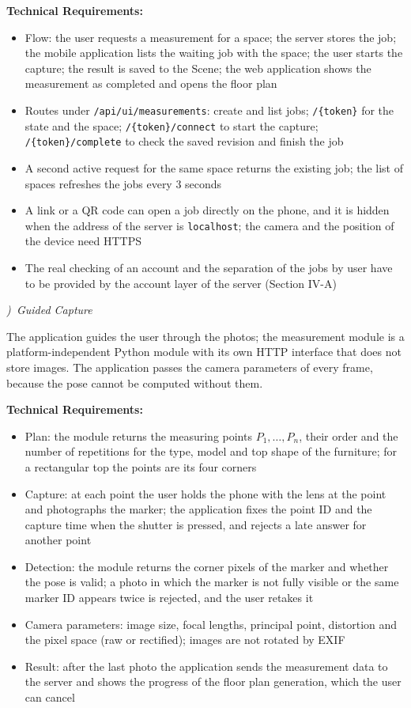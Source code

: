 \documentclass[conference]{IEEEtran}
\newcommand{\subsubhead}[1]{\par\noindent\refstepcounter{subsubsection}%
{\normalfont\normalsize\itshape\arabic{subsubsection})\ #1}\par\nopagebreak}
\newcommand{\TR}{\par\noindent\textbf{Technical Requirements:}\par\nopagebreak}
\begin{document}
\TR
\begin{itemize}
\item Flow: the user requests a measurement for a space; the server stores the job; the mobile application lists the waiting job with the space; the user starts the capture; the result is saved to the Scene; the web application shows the measurement as completed and opens the floor plan
\item Routes under \texttt{/api/ui/measurements}: create and list jobs; \texttt{/\{token\}} for the state and the space; \texttt{/\{token\}/connect} to start the capture; \texttt{/\{token\}/complete} to check the saved revision and finish the job
\item A second active request for the same space returns the existing job; the list of spaces refreshes the jobs every 3 seconds
\item A link or a QR code can open a job directly on the phone, and it is hidden when the address of the server is \texttt{localhost}; the camera and the position of the device need HTTPS
\item The real checking of an account and the separation of the jobs by user have to be provided by the account layer of the server (Section IV-A)
\end{itemize}

\subsubhead{Guided Capture}
\noindent\hspace*{\parindent}The application guides the user through the photos; the measurement module is a platform-independent Python module with its own HTTP interface that does not store images. The application passes the camera parameters of every frame, because the pose cannot be computed without them.

\TR
\begin{itemize}
\item Plan: the module returns the measuring points $P_1,\dots,P_n$, their order and the number of repetitions for the type, model and top shape of the furniture; for a rectangular top the points are its four corners
\item Capture: at each point the user holds the phone with the lens at the point and photographs the marker; the application fixes the point ID and the capture time when the shutter is pressed, and rejects a late answer for another point
\item Detection: the module returns the corner pixels of the marker and whether the pose is valid; a photo in which the marker is not fully visible or the same marker ID appears twice is rejected, and the user retakes it
\item Camera parameters: image size, focal lengths, principal point, distortion and the pixel space (raw or rectified); images are not rotated by EXIF
\item Result: after the last photo the application sends the measurement data to the server and shows the progress of the floor plan generation, which the user can cancel
\end{itemize}
\end{document}
